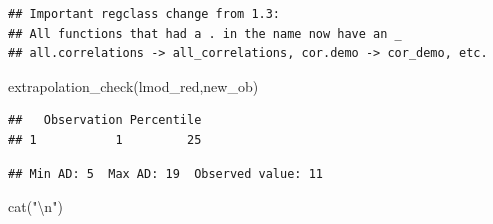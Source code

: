 \documentclass[
]{article}
\newenvironment{Shaded}{\begin{snugshade}}{\end{snugshade}}
\newcommand{\CommentTok}[1]{\textcolor[rgb]{0.56,0.35,0.01}{\textit{#1}}}
\newcommand{\DecValTok}[1]{\textcolor[rgb]{0.00,0.00,0.81}{#1}}
\newcommand{\FunctionTok}[1]{\textcolor[rgb]{0.00,0.00,0.00}{#1}}
\newcommand{\NormalTok}[1]{#1}
\newcommand{\OtherTok}[1]{\textcolor[rgb]{0.56,0.35,0.01}{#1}}
\newcommand{\SpecialCharTok}[1]{\textcolor[rgb]{0.00,0.00,0.00}{#1}}
\newcommand{\StringTok}[1]{\textcolor[rgb]{0.31,0.60,0.02}{#1}}
\begin{document}
\begin{verbatim}
## Important regclass change from 1.3:
## All functions that had a . in the name now have an _
## all.correlations -> all_correlations, cor.demo -> cor_demo, etc.
\end{verbatim}

\begin{Shaded}
\begin{Highlighting}[]
\FunctionTok{extrapolation\_check}\NormalTok{(lmod\_red,new\_ob)}
\end{Highlighting}
\end{Shaded}

\begin{verbatim}
##   Observation Percentile
## 1           1         25
\end{verbatim}

\begin{Shaded}
\end{Shaded}

\begin{verbatim}
## Min AD: 5  Max AD: 19  Observed value: 11
\end{verbatim}

\begin{Shaded}
\begin{Highlighting}[]
\FunctionTok{cat}\NormalTok{(}\StringTok{"}\SpecialCharTok{\textbackslash{}n}\StringTok{"}\NormalTok{)}
\end{Highlighting}
\end{Shaded}

\begin{Shaded}
\end{Shaded}
\end{document}
